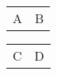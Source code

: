 \documentclass{article}
\begin{document}
\noindent\lipsum[1][1-2]

\noindent
\begin{tabular}{ll}
  A & B
\end{tabular}

{
\setlength{\tabcolsep}{0pt}
\noindent
\begin{tabular}{ll}
  C & D
\end{tabular}
}
\end{document}
